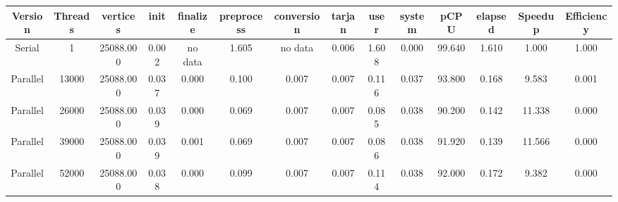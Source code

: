 \begin{tabular}{|c|c|c|c|c|c|c|c|c|c|c|c|c|c|}
\toprule
 Version &  Threads &  vertices &  init & finalize &  preprocess & conversion &  tarjan &  user &  system &   pCPU &  elapsed &  Speedup &  Efficiency \\
\midrule
  Serial &        1 & 25088.000 & 0.002 &  no data &       1.605 &    no data &   0.006 & 1.608 &   0.000 & 99.640 &    1.610 &    1.000 &       1.000 \\
Parallel &    13000 & 25088.000 & 0.037 &    0.000 &       0.100 &      0.007 &   0.007 & 0.116 &   0.037 & 93.800 &    0.168 &    9.583 &       0.001 \\
Parallel &    26000 & 25088.000 & 0.039 &    0.000 &       0.069 &      0.007 &   0.007 & 0.085 &   0.038 & 90.200 &    0.142 &   11.338 &       0.000 \\
Parallel &    39000 & 25088.000 & 0.039 &    0.001 &       0.069 &      0.007 &   0.007 & 0.086 &   0.038 & 91.920 &    0.139 &   11.566 &       0.000 \\
Parallel &    52000 & 25088.000 & 0.038 &    0.000 &       0.099 &      0.007 &   0.007 & 0.114 &   0.038 & 92.000 &    0.172 &    9.382 &       0.000 \\
\bottomrule
\end{tabular}
